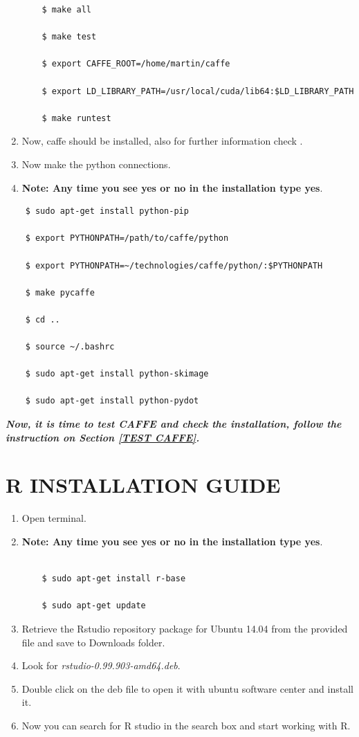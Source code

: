 \documentclass[12pt]{article}
\begin{document}
\begin{enumerate}
\begin{lstlisting}
    $ make all

    $ make test

    $ export CAFFE_ROOT=/home/martin/caffe

    $ export LD_LIBRARY_PATH=/usr/local/cuda/lib64:$LD_LIBRARY_PATH

    $ make runtest
\end{lstlisting}

  \item Now, caffe should be installed, also for further information check \cite{caffe_further}.
  \item Now make the python connections.
  \item \textbf{Note: Any time you see yes or no in the installation type yes}.
\end{enumerate}


\begin{lstlisting}
    $ sudo apt-get install python-pip

    $ export PYTHONPATH=/path/to/caffe/python

    $ export PYTHONPATH=~/technologies/caffe/python/:$PYTHONPATH

    $ make pycaffe

    $ cd ..

    $ source ~/.bashrc

    $ sudo apt-get install python-skimage

    $ sudo apt-get install python-pydot
\end{lstlisting}

\textbf{\emph{Now, it is time to test CAFFE and check the installation, follow the instruction on Section \ref{TEST CAFFE}.}}

\newpage
\section{R INSTALLATION GUIDE}
\begin{enumerate}
  \item Open terminal.
  \item \textbf{Note: Any time you see yes or no in the installation type yes}.

\begin{lstlisting}

    $ sudo apt-get install r-base

    $ sudo apt-get update

\end{lstlisting}

  \item Retrieve the Rstudio  repository package for Ubuntu 14.04 from the provided file and save to Downloads folder.
  \item Look for \emph{rstudio-0.99.903-amd64.deb}.
  \item Double click on the deb file to open it with ubuntu software center and install it.
  \item Now you can search for R studio in the search box and start working with R.
\end{enumerate}
\end{document}
